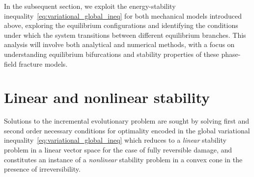 

In the subsequent section, we exploit the energy-stability inequality~\eqref{eq:variational_global_ineq} for both mechanical models introduced above, exploring the equilibrium configurations and identifying the conditions under which the system transitions between different equilibrium branches. 
This analysis will involve both analytical and numerical methods, with a focus on understanding equilibrium bifurcations and stability properties of these phase-field fracture models.






% 

\section{Linear and nonlinear stability}
\label{sec:stability}

Solutions to the incremental evolutionary problem are sought by solving first and second order necessary conditions for optimality encoded in the global variational inequality~\eqref{eq:variational_global_ineq} which reduces to a \emph{linear} stability problem in a linear vector space for the case of fully reversible damage, and constitutes an instance of a \emph{nonlinear} stability problem in a convex cone in the presence of irreversibility.

